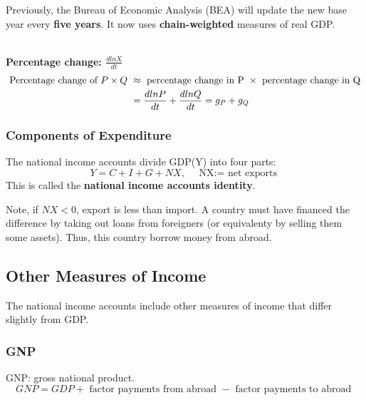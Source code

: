 \documentclass[12pt]{article}
\begin{document}
Previously, the Bureau of Economic Analysis (BEA) will update the new base year every 
{\textbf {five years}}. It now uses {\textbf {chain-weighted}} measures of real GDP.

\noindent{}\\


{\textbf {Percentage change: $ \frac{dlnX}{dt} $}}\\
\begin{align*}
\text{ Percentage change of $ P  \times Q $ } &\approx
\text{ percentage change in P } \times \text{ percentage change in Q }\\
 &= \frac{dlnP}{dt} + \frac{dlnQ}{dt} = g_{P} + g_{Q}
\end{align*}

\subsubsection{Components of Expenditure}
The national income accounts divide GDP(Y) into four parts:
\begin{equation*}
Y = C + I + G + NX,\quad \text{ NX:= net exports }
\end{equation*}
This is called the {\textbf {national income accounts identity}}.

Note, if $ NX < 0 $, export is less than import. A country must have financed the
difference by taking out loans from foreigners (or equivalenty by selling them
some assets). Thus, this country borrow money from abroad.



\subsection{Other Measures of Income}


The national income accounts include other measures of income that differ slightly
from GDP.

\subsubsection{GNP}
GNP: gross national product.
\begin{equation*}
GNP = GDP + \text{ factor payments from abroad } - \text{ factor payments to abroad }
\end{equation*}
\end{document}
